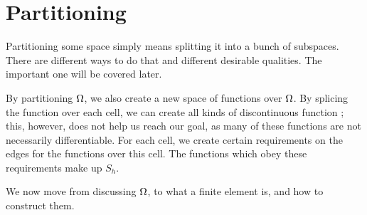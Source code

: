 \section{Partitioning}
Partitioning some space simply means splitting it into a bunch of subspaces. 
There are different ways to do that and different desirable qualities. 
The important one will be covered later.

By partitioning $\Omega$, we also create a new space of functions over $\Omega$. 
By splicing %
the function over each cell, we can create all kinds of 
discontinuous function%
; this, however, does not help us reach our goal, 
as many of these functions are not necessarily differentiable. 
For each cell, we create certain requirements on the edges for the functions 
over this cell. The functions which obey these requirements make up $S_h$.




We now move from discussing $\Omega$, to what a finite element is,
and how to construct them.